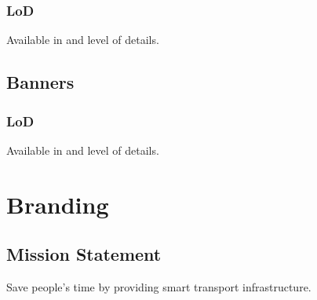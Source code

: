 \documentclass[letterpaper,10pt,english]{sphinxmanual}
\begin{document}
\subsubsection{LoD}
\label{\detokenize{design/design_assets:id1}}
Available in  and  level of details.


\subsection{Banners}
\label{\detokenize{design/design_assets:banners}}
\begin{figure}[htbp]
\centering

\noindent{}
\end{figure}

\begin{figure}[htbp]
\centering

\noindent{}
\end{figure}

\begin{figure}[htbp]
\centering

\noindent{}
\end{figure}

\begin{figure}[htbp]
\centering

\noindent{}
\end{figure}


\subsubsection{LoD}
\label{\detokenize{design/design_assets:id2}}
Available in  and  level of details.


\section{Branding}
\label{\detokenize{design/branding:branding}}\label{\detokenize{design/branding::doc}}

\subsection{Mission Statement}
\label{\detokenize{design/branding:mission-statement}}
Save people’s time by providing smart transport infrastructure.
\end{document}
